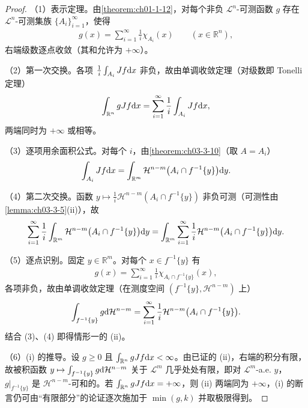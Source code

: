 \documentclass[../../main.tex]{subfiles}%
\begin{document}
\begin{proof}
（1）表示定理。由\cref{theorem:ch01-1-12}，对每个非负 $\mathcal{L}^n$-可测函数 $g$ 存在 $\mathcal{L}^n$-可测集族 $\{A_i\}_{i=1}^{\infty}$，使得%
\begin{align*}
g(x)=\sum_{i=1}^{\infty}\frac{1}{i}\chi_{A_i}(x)\qquad(x\in\mathbb{R}^n),
\end{align*}
右端级数逐点收敛（其和允许为 $+\infty$）。

（2）第一次交换。各项 $\frac{1}{i}\int_{A_i}Jf\mathrm{d} x$ 非负，故由单调收敛定理（对级数即 Tonelli 定理）
\begin{align*}
\int_{\mathbb{R}^n}gJf\mathrm{d} x=\sum_{i=1}^{\infty}\frac{1}{i}\int_{A_i}Jf\mathrm{d} x,
\end{align*}
两端同时为 $+\infty$ 或相等。

（3）逐项用余面积公式。对每个 $i$，由\cref{theorem:ch03-3-10}（取 $A=A_i$）%
\begin{align*}
\int_{A_i}Jf\mathrm{d} x=\int_{\mathbb{R}^m}\mathcal{H}^{n-m}\bigl(A_i\cap f^{-1}\{y\}\bigr)\mathrm{d} y.
\end{align*}

（4）第二次交换。函数 $y\mapsto\frac{1}{i}\mathcal{H}^{n-m}(A_i\cap f^{-1}\{y\})$ 非负可测（可测性由\cref{lemma:ch03-3-5}(ii)），故%
\begin{align*}
\sum_{i=1}^{\infty}\frac{1}{i}\int_{\mathbb{R}^m}\mathcal{H}^{n-m}\bigl(A_i\cap f^{-1}\{y\}\bigr)\mathrm{d} y=\int_{\mathbb{R}^m}\sum_{i=1}^{\infty}\frac{1}{i}\mathcal{H}^{n-m}\bigl(A_i\cap f^{-1}\{y\}\bigr)\mathrm{d} y.
\end{align*}

（5）逐点识别。固定 $y\in\mathbb{R}^m$。对每个 $x\in f^{-1}\{y\}$ 有
\begin{align*}
g(x)=\sum_{i=1}^{\infty}\frac{1}{i}\chi_{A_i\cap f^{-1}\{y\}}(x),
\end{align*}
各项非负，故由单调收敛定理（在测度空间 $(f^{-1}\{y\},\mathcal{H}^{n-m})$ 上）
\begin{align*}
\int_{f^{-1}\{y\}}g\mathrm{d}\mathcal{H}^{n-m}=\sum_{i=1}^{\infty}\frac{1}{i}\mathcal{H}^{n-m}\bigl(A_i\cap f^{-1}\{y\}\bigr).
\end{align*}
结合 (3)、(4) 即得情形一的 (ii)。

（6）(i) 的推导。设 $g\geqslant0$ 且 $\int_{\mathbb{R}^n}gJf\mathrm{d} x<\infty$。由已证的 (ii)，右端的积分有限，故被积函数 $y\mapsto\int_{f^{-1}\{y\}}g\mathrm{d}\mathcal{H}^{n-m}$ 关于 $\mathcal{L}^m$ 几乎处处有限，即对 $\mathcal{L}^m$-a.e. $y$，$g|_{f^{-1}\{y\}}$ 是 $\mathcal{H}^{n-m}$-可和的。若 $\int_{\mathbb{R}^n}gJf\mathrm{d} x=+\infty$，则 (ii) 两端同为 $+\infty$，(i) 的断言仍可由“有限部分”的论证逐次施加于 $\min(g,k)$ 并取极限得到。


\end{proof}
\end{document}
